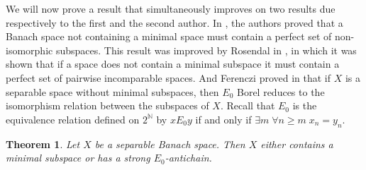 \documentclass[10pt]{amsart}
\numberwithin{equation}{section}
\newtheorem{thm}{Theorem}[section]
\begin{document}
We will now prove a result that simultaneously improves on two results due
respectively to the first and the second author. In \cite{ergodic}, the authors
proved that a Banach space not containing a minimal space must contain a
perfect set of non-isomorphic subspaces. This result was improved by Rosendal
in \cite{incomparable}, in which it was shown that if a space does not contain
a minimal subspace it must contain a perfect set of pairwise incomparable
spaces. And Ferenczi proved in \cite{subsurfaces} that if $X$ is a separable
space without minimal subspaces, then $E_0$ Borel reduces to the isomorphism
relation between the subspaces of $X$. Recall that  $E_0$ is the equivalence
relation defined on $2^{\mathbb N}$ by  $x E_0 y$ if and only if $\exists m\; \forall
n {\ensuremath{\geqslant}} m\; x_n=y_n$.

\begin{thm}\label{E_0-antichain}
Let $X$ be a separable Banach space. Then $X$ either contains a minimal
subspace or has a strong $E_0$-antichain.
\end{thm}
\end{document}
